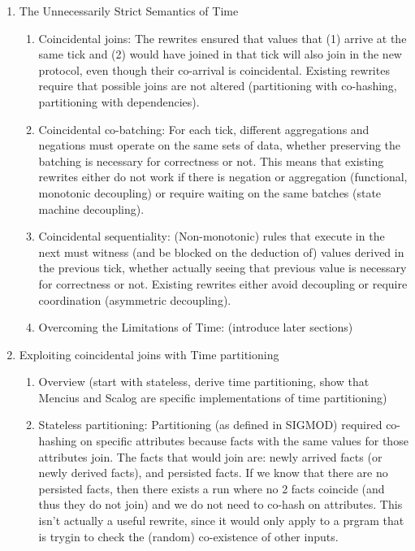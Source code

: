 \begin{enumerate}
\begin{enumerate}
      \item Proof technique (observable equivalence, linearizability)
    \end{enumerate}
  \item The Unnecessarily Strict Semantics of Time
    \begin{enumerate}
      \item Coincidental joins: The rewrites ensured that values that (1) arrive at the same tick and (2) would have joined in that tick will also join in the new protocol, even though their co-arrival is coincidental. Existing rewrites require that possible joins are not altered (partitioning with co-hashing, partitioning with dependencies).
      \item Coincidental co-batching: For each tick, different aggregations and negations must operate on the same sets of data, whether preserving the batching is necessary for correctness or not. This means that existing rewrites either do not work if there is negation or aggregation (functional, monotonic decoupling) or require waiting on the same batches (state machine decoupling).
      \item Coincidental sequentiality: (Non-monotonic) rules that execute in the next must witness (and be blocked on the deduction of) values derived in the previous tick, whether actually seeing that previous value is necessary for correctness or not. Existing rewrites either avoid decoupling or require coordination (asymmetric decoupling).
      \item Overcoming the Limitations of Time: (introduce later sections)
    \end{enumerate}
  \item Exploiting coincidental joins with Time partitioning
    \begin{enumerate}
      \item Overview (start with stateless, derive time partitioning, show that Mencius and Scalog are specific implementations of time partitioning)
      \item Stateless partitioning: Partitioning (as defined in SIGMOD) required co-hashing on specific attributes because facts with the same values for those attributes join. 
        The facts that would join are: newly arrived facts (or newly derived facts), and persisted facts.
        If we know that there are no persisted facts, then there exists a run where no 2 facts coincide (and thus they do not join) and we do not need to co-hash on attributes.
        This isn't actually a useful rewrite, since it would only apply to a prgram that is trygin to check the (random) co-existence of other inputs.

\end{enumerate}
\end{enumerate}
